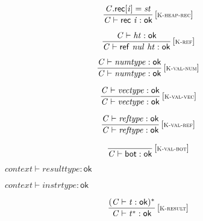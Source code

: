 $$
\begin{array}{@{}c@{}}\displaystyle
\frac{
{\mathit{C}}.\mathsf{rec}{}[{\mathit{i}}] = {\mathit{st}}
}{
{\mathit{C}} \vdash \mathsf{rec}~{\mathit{i}} : \mathsf{ok}
} \, {[\textsc{\scriptsize K{-}heap{-}rec}]}
\qquad
\end{array}
$$

$$
\begin{array}{@{}c@{}}\displaystyle
\frac{
{\mathit{C}} \vdash {\mathit{ht}} : \mathsf{ok}
}{
{\mathit{C}} \vdash \mathsf{ref}~{\mathit{nul}}~{\mathit{ht}} : \mathsf{ok}
} \, {[\textsc{\scriptsize K{-}ref}]}
\qquad
\end{array}
$$

$$
\begin{array}{@{}c@{}}\displaystyle
\frac{
{\mathit{C}} \vdash {\mathit{numtype}} : \mathsf{ok}
}{
{\mathit{C}} \vdash {\mathit{numtype}} : \mathsf{ok}
} \, {[\textsc{\scriptsize K{-}val{-}num}]}
\qquad
\end{array}
$$

$$
\begin{array}{@{}c@{}}\displaystyle
\frac{
{\mathit{C}} \vdash {\mathit{vectype}} : \mathsf{ok}
}{
{\mathit{C}} \vdash {\mathit{vectype}} : \mathsf{ok}
} \, {[\textsc{\scriptsize K{-}val{-}vec}]}
\qquad
\end{array}
$$

$$
\begin{array}{@{}c@{}}\displaystyle
\frac{
{\mathit{C}} \vdash {\mathit{reftype}} : \mathsf{ok}
}{
{\mathit{C}} \vdash {\mathit{reftype}} : \mathsf{ok}
} \, {[\textsc{\scriptsize K{-}val{-}ref}]}
\qquad
\end{array}
$$

$$
\begin{array}{@{}c@{}}\displaystyle
\frac{
}{
{\mathit{C}} \vdash \mathsf{bot} : \mathsf{ok}
} \, {[\textsc{\scriptsize K{-}val{-}bot}]}
\qquad
\end{array}
$$

\vspace{1ex}

$\boxed{{\mathit{context}} \vdash {\mathit{resulttype}} : \mathsf{ok}}$

$\boxed{{\mathit{context}} \vdash {\mathit{instrtype}} : \mathsf{ok}}$

$$
\begin{array}{@{}c@{}}\displaystyle
\frac{
({\mathit{C}} \vdash {\mathit{t}} : \mathsf{ok})^\ast
}{
{\mathit{C}} \vdash {{\mathit{t}}^\ast} : \mathsf{ok}
} \, {[\textsc{\scriptsize K{-}result}]}
\qquad
\end{array}
$$

